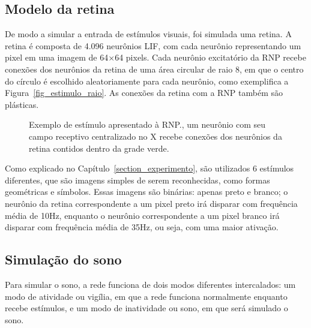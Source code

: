 \subsection{Modelo da retina}\label{subsection_retina}

De modo a simular a entrada de estímulos visuais, foi simulada uma retina. A retina é composta de 4.096 neurônios LIF, com cada
neurônio representando um pixel em uma imagem de 64$\times$64 pixels. Cada neurônio excitatório da RNP recebe conexões dos
neurônios da retina de uma área circular de raio 8, em que o centro do círculo é escolhido aleatoriamente para cada neurônio, como
exemplifica a Figura~\ref{fig_estimulo_raio}. As conexões da retina com a RNP também são plásticas.

\begin{figure}[!ht]
\caption{Exemplo de estímulo apresentado à RNP.\@Aqui, um neurônio com seu campo receptivo centralizado no X recebe conexões dos neurônios da retina contidos dentro da grade verde.}
\end{figure}

Como explicado no Capítulo~\ref{section_experimento}, são utilizados 6 estímulos diferentes, que são imagens simples de serem
reconhecidas, como formas geométricas e símbolos. Essas imagens são binárias: apenas preto e branco; o neurônio da retina
correspondente a um pixel preto irá disparar com frequência média de 10Hz, enquanto o neurônio correspondente a um pixel branco
irá disparar com frequência média de 35Hz, ou seja, com uma maior ativação.

\subsection{Simulação do sono}\label{subsection_sono}

Para simular o sono, a rede funciona de dois modos diferentes intercalados: um modo de atividade ou vigília, em que a rede
funciona normalmente enquanto recebe estímulos, e um modo de inatividade ou sono, em que será simulado o sono. 

